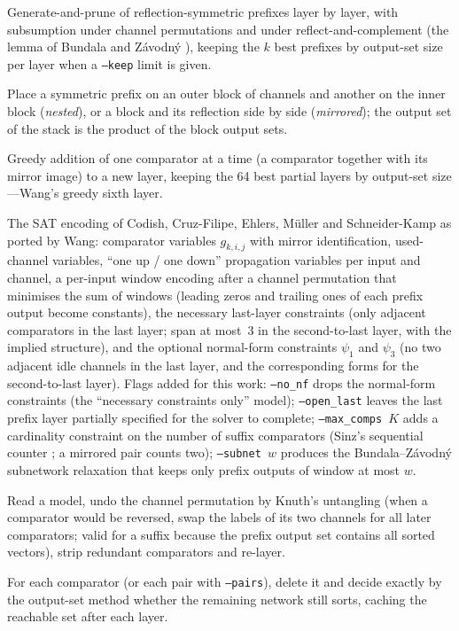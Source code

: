 \documentclass[11pt,a4paper]{article}
\theoremstyle{plain}
\theoremstyle{definition}
\theoremstyle{remark}
\begin{document}
\begin{description}[style=nextline,font=\ttfamily]
\item[gen] Generate-and-prune of reflection-symmetric prefixes layer by layer, with subsumption under channel permutations and under reflect-and-complement (the lemma of Bundala and Z\'avodn\'y \cite{BZ14}), keeping the $k$ best prefixes by output-set size per layer when a \texttt{--keep} limit is given.
\item[stack] Place a symmetric prefix on an outer block of channels and another on the inner block (\emph{nested}), or a block and its reflection side by side (\emph{mirrored}); the output set of the stack is the product of the block output sets.
\item[extend] Greedy addition of one comparator at a time (a comparator together with its mirror image) to a new layer, keeping the 64 best partial layers by output-set size---Wang's greedy sixth layer.
\item[cnf] The SAT encoding of Codish, Cruz-Filipe, Ehlers, M\"uller and Schneider-Kamp \cite{CCEMS19} as ported by Wang: comparator variables $g_{k,i,j}$ with mirror identification, used-channel variables, ``one up / one down'' propagation variables per input and channel, a per-input window encoding after a channel permutation that minimises the sum of windows (leading zeros and trailing ones of each prefix output become constants), the necessary last-layer constraints (only adjacent comparators in the last layer; span at most~3 in the second-to-last layer, with the implied structure), and the optional normal-form constraints $\psi_1$ and $\psi_3$ (no two adjacent idle channels in the last layer, and the corresponding forms for the second-to-last layer). Flags added for this work: \texttt{--no\_nf} drops the normal-form constraints (the ``necessary constraints only'' model); \texttt{--open\_last} leaves the last prefix layer partially specified for the solver to complete; \texttt{--max\_comps~$K$} adds a cardinality constraint on the number of suffix comparators (Sinz's sequential counter \cite{Sinz05}; a mirrored pair counts two); \texttt{--subnet~$w$} produces the Bundala--Z\'avodn\'y subnetwork relaxation that keeps only prefix outputs of window at most $w$.
\item[decode] Read a model, undo the channel permutation by Knuth's untangling (when a comparator would be reversed, swap the labels of its two channels for all later comparators; valid for a suffix because the prefix output set contains all sorted vectors), strip redundant comparators and re-layer.
\item[prune] For each comparator (or each pair with \texttt{--pairs}), delete it and decide exactly by the output-set method whether the remaining network still sorts, caching the reachable set after each layer.
\end{description}
\end{document}
